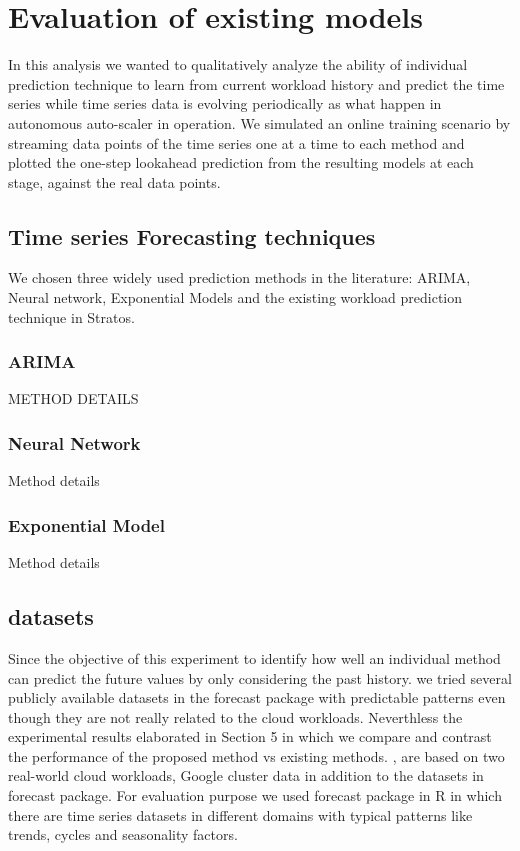 \section{Evaluation of existing models}

In this analysis we wanted to qualitatively analyze the ability of individual prediction technique to learn from current workload history and predict the time series while time series data is evolving periodically as what happen in autonomous auto-scaler in operation. We simulated an online training scenario by streaming data points of the time series one at a time to each method and plotted the one-step lookahead prediction from the resulting models at each stage, against the real data points. 

\subsection{Time series Forecasting techniques}
We chosen three widely used prediction methods in the literature: ARIMA, Neural network, Exponential Models and the existing workload prediction technique in Stratos.

\subsubsection{ARIMA}
METHOD DETAILS

\subsubsection{Neural Network}
Method details

\subsubsection{Exponential Model}
Method details




\subsection{datasets}
Since the objective of this experiment to identify how well an individual method can predict the future values by only considering the past history. we tried several publicly available datasets in the forecast package with predictable patterns even though they are not really related to the cloud workloads. Neverthless the experimental results elaborated in Section 5 in which we  compare and contrast the performance of the proposed method vs existing methods. , are based on two real-world cloud workloads, Google cluster data  in addition to the datasets in forecast package. For evaluation purpose we used forecast package in R \cite{forecastPackage} in which there are time series datasets in different domains with typical patterns like trends, cycles and seasonality factors. 

